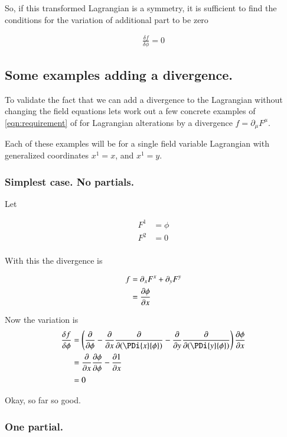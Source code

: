 \documentclass{article}
\begin{document}
So, if this transformed Lagrangian is a symmetry, it is sufficient to
find the conditions for the variation of additional part to be zero

\begin{align}\label{eqn:requirement}
\frac{\delta f}{\delta \phi} = 0
\end{align}

\subsection{ Some examples adding a divergence. }

To validate the fact that we can add a divergence to the Lagrangian without
changing the field equations lets work out a few concrete examples 
of \ref{eqn:requirement} of for Lagrangian alterations by a divergence
$f = \partial_\mu F^\mu$.

Each of these examples will be for a single field variable Lagrangian 
with generalized coordinates $x^1 = x$, and $x^1 = y$.
 
\subsubsection{ Simplest case.  No partials. }

Let 

\begin{align*}
F^1 &= \phi \\
F^2 &= 0 \\
\end{align*}

With this the divergence is 

\begin{align*}
f 
&= \partial_x F^x + \partial_y F^y  \\
&=
\frac{\partial {\phi}}{\partial {x}}
\end{align*}

Now the variation is
\begin{align*}
\frac{\delta f}{\delta \phi} 
&= 
\left( \PD{\phi}{} 
- \PD{x}{}\PD{(\PDi{x}{\phi})}{} 
- \PD{y}{}\PD{(\PDi{y}{\phi})}{} 
\right) \PD{x}{\phi} \\
&= 
\PD{x}{}\PD{\phi}{\phi} - \PD{x}{1} \\
&= 0
\end{align*}

Okay, so far so good.

\subsubsection{ One partial. }
\end{document}
